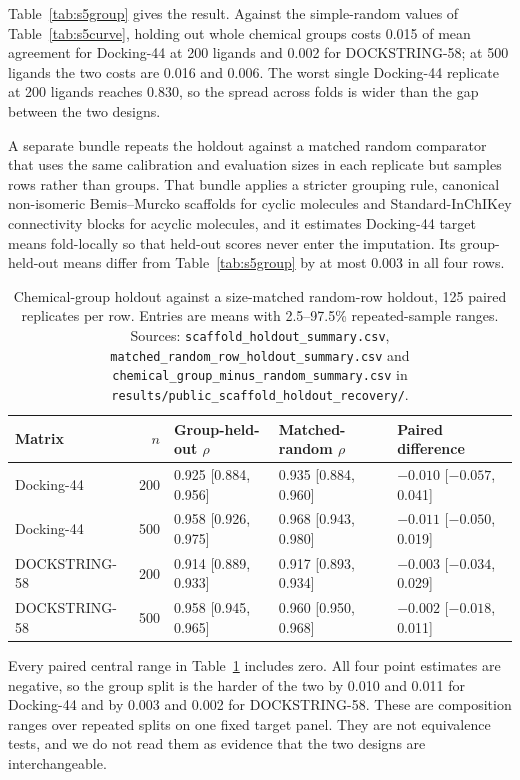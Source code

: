 Table~\ref{tab:s5group} gives the result. Against the simple-random values of
Table~\ref{tab:s5curve}, holding out whole chemical groups costs 0.015 of mean agreement for
Docking-44 at 200 ligands and 0.002 for DOCKSTRING-58; at 500 ligands the two costs are 0.016 and
0.006. The worst single Docking-44 replicate at 200 ligands reaches 0.830, so the spread across
folds is wider than the gap between the two designs.

A separate bundle repeats the holdout against a matched random comparator that uses the same
calibration and evaluation sizes in each replicate but samples rows rather than groups. That
bundle applies a stricter grouping rule, canonical non-isomeric Bemis--Murcko scaffolds for
cyclic molecules and Standard-InChIKey connectivity blocks for acyclic molecules, and it
estimates Docking-44 target means fold-locally so that held-out scores never enter the
imputation. Its group-held-out means differ from Table~\ref{tab:s5group} by at most 0.003 in all
four rows.

\begin{table}[htbp]
\centering
\caption{Chemical-group holdout against a size-matched random-row holdout, 125 paired replicates
per row. Entries are means with 2.5--97.5\% repeated-sample ranges. Sources:
\texttt{scaffold\_holdout\_summary.csv},
\texttt{matched\_random\_row\_holdout\_summary.csv} and
\texttt{chemical\_group\_minus\_random\_summary.csv} in
\texttt{results/public\_scaffold\_holdout\_recovery/}.}
\label{tab:s5matched}
\small
\begin{tabular}{lrlll}
\toprule
Matrix & $n$ & Group-held-out $\rho$ & Matched-random $\rho$ & Paired difference \\
\midrule
Docking-44 & 200 & 0.925 [0.884, 0.956] & 0.935 [0.884, 0.960] & $-0.010$ [$-0.057$, 0.041] \\
Docking-44 & 500 & 0.958 [0.926, 0.975] & 0.968 [0.943, 0.980] & $-0.011$ [$-0.050$, 0.019] \\
DOCKSTRING-58 & 200 & 0.914 [0.889, 0.933] & 0.917 [0.893, 0.934] & $-0.003$ [$-0.034$, 0.029] \\
DOCKSTRING-58 & 500 & 0.958 [0.945, 0.965] & 0.960 [0.950, 0.968] & $-0.002$ [$-0.018$, 0.011] \\
\bottomrule
\end{tabular}
\end{table}

Every paired central range in Table~\ref{tab:s5matched} includes zero. All four point estimates
are negative, so the group split is the harder of the two by 0.010 and 0.011 for Docking-44 and
by 0.003 and 0.002 for DOCKSTRING-58. These are composition ranges over repeated splits on one
fixed target panel. They are not equivalence tests, and we do not read them as evidence that the
two designs are interchangeable.

